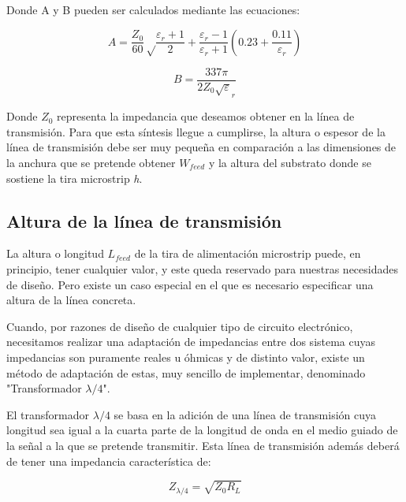 \par Donde A y B pueden ser calculados mediante las ecuaciones:

\begin{equation}
	A=\frac{Z_{0}}{60}\sqrt\frac{\varepsilon_{r}+1}{2}+\frac{\varepsilon_{r}-1}{\varepsilon_{r}+1}\left ( 0.23+\frac{0.11}{\varepsilon_{r}} \right ) 
	\label{eq:A}
\end{equation}

\begin{equation}
	B=\frac{337\pi}{2Z_{0}\sqrt\varepsilon_{r}} 
	\label{eq:B}
\end{equation}

\par Donde $Z_{0}$ representa la impedancia que deseamos obtener en la línea de transmisión. Para que esta síntesis llegue a cumplirse, la altura o espesor de la línea de transmisión debe ser muy pequeña en comparación a las dimensiones de la anchura que se pretende obtener $W_{feed}$ y la altura del substrato donde se sostiene la tira microstrip \textit{h}.

\subsection{Altura de la línea de transmisión}
\par La altura o longitud $L_{feed}$ de la tira de alimentación microstrip puede, en principio, tener cualquier valor, y este queda reservado para nuestras necesidades de diseño. Pero existe un caso especial en el que es necesario especificar una altura de la línea concreta.
\\
\par Cuando, por razones de diseño de cualquier tipo de circuito electrónico, necesitamos realizar una adaptación de impedancias entre dos sistema cuyas impedancias son puramente reales u óhmicas y de distinto valor, existe un método de adaptación de estas, muy sencillo de implementar, denominado "Transformador $\lambda/4$". 
\\
\par El transformador $\lambda/4$ se basa en la adición de una línea de transmisión cuya longitud sea igual a la cuarta parte de la longitud de onda en el medio guiado de la señal a la que se pretende transmitir. Esta línea de transmisión además deberá de tener una impedancia característica de:

\begin{equation}
	Z_{\lambda /4}=\sqrt{Z_{0}R_{L}}
	\label{eq:lambdacuartos}
\end{equation}

